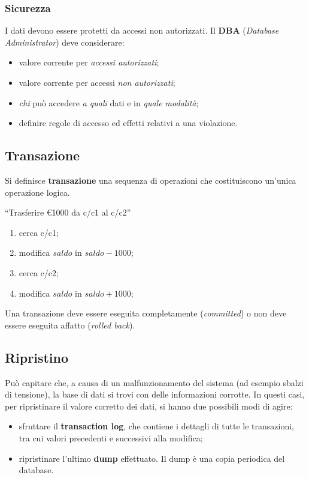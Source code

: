  \subsubsection{Sicurezza}
 I dati devono essere protetti da accessi non autorizzati. Il \textbf{DBA} (\emph{Database 
 Administrator}) deve considerare:
 \begin{itemize}
  \item valore corrente per \emph{accessi autorizzati};
  \item valore corrente per accessi \emph{non autorizzati};
  \item \emph{chi} può accedere \emph{a quali} dati e in \emph{quale modalità};
  \item definire regole di accesso ed effetti relativi a una violazione.
 \end{itemize}
 
 \subsection{Transazione}
 \begin{defn}Si definisce \textbf{transazione} una sequenza di operazioni che costituiscono 
 un'unica operazione logica.\end{defn}
 \begin{exmp}
  ``Trasferire €1000 da c/c1 al c/c2''
    \begin{enumerate}
     \item cerca c/c1;
     \item modifica $saldo$ in $saldo - 1000$;
     \item cerca c/c2;
     \item modifica $saldo$ in $saldo + 1000$;
    \end{enumerate}
 \end{exmp}
 Una transazione deve essere eseguita completamente (\emph{committed}) o non deve essere eseguita
 affatto (\emph{rolled back}).
 
 \subsection{Ripristino}
 Può capitare che, a causa di un malfunzionamento del sistema (ad esempio sbalzi di tensione), la
 base di dati si trovi con delle informazioni corrotte. In questi casi, per ripristinare il valore
 corretto dei dati, si hanno due possibili modi di agire:
 \begin{itemize}
  \item sfruttare il \textbf{transaction log}, che contiene i dettagli di tutte le transazioni,
  tra cui valori precedenti e successivi alla modifica;
  \item ripristinare l'ultimo \textbf{dump} effettuato. Il dump è una copia periodica del
  database.
 \end{itemize}
 
